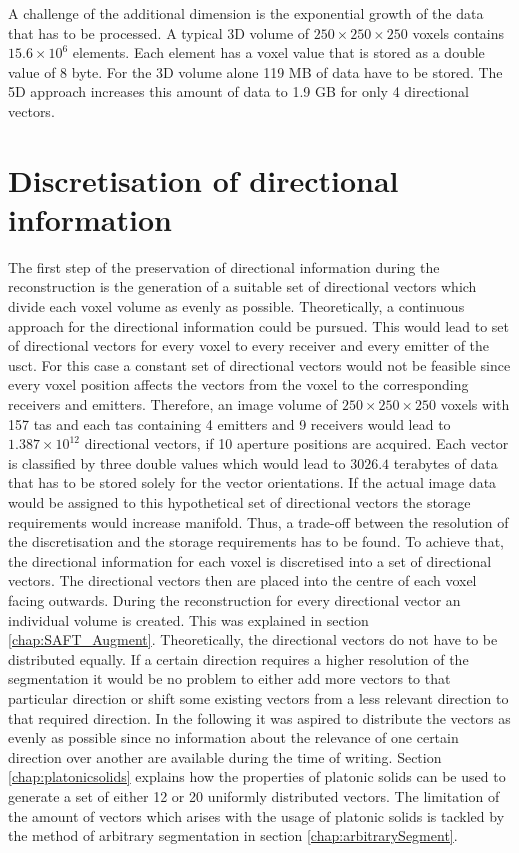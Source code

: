 A challenge of the additional dimension is the exponential growth of the data that has to be processed. A typical 3D volume of $250\times250\times250$ voxels contains $15.6\times10^6$ elements. Each element has a voxel value that is stored as a double value of 8 byte. For the 3D volume alone 119 MB of data have to be stored. The 5D approach increases this amount of data to 1.9 GB for only 4 directional vectors.   



\section{Discretisation of directional information}
\label{chap:segmentation}


The first step of the preservation of directional information during the reconstruction is the generation of a suitable set of directional vectors which divide each voxel volume as evenly as possible.
Theoretically, a continuous approach for the directional information could be pursued. This would lead to set of directional vectors for every voxel to every receiver and every emitter of the \ac{usct}. For this case a constant set of directional vectors would not be feasible since every voxel position affects the vectors from the voxel to the corresponding receivers and emitters. Therefore, an image volume of $250 \times 250 \times 250$ voxels with 157 \ac{tas} and each \ac{tas} containing 4 emitters and 9 receivers would lead to $1.387\times 10^{12}$ directional vectors, if 10 aperture positions are acquired. Each vector is classified by three double values which would lead to $3026.4$ terabytes of data that has to be stored solely for the vector orientations. If the actual image data would be assigned to this hypothetical set of directional vectors the storage requirements would increase manifold. Thus, a trade-off between the resolution of the discretisation and the storage requirements has to be found. To achieve that, the directional information for each voxel is discretised into a set of directional vectors. The directional vectors then are placed into the centre of each voxel facing outwards. During the reconstruction for every directional vector an individual volume is created. This was explained in section \ref{chap:SAFT_Augment}. Theoretically, the directional vectors do not have to be distributed equally. If a certain direction requires a higher resolution of the segmentation it would be no problem to either add more vectors to that particular direction or shift some existing vectors from a less relevant direction to that required direction. In the following it was aspired to distribute the vectors as evenly as possible since no information about the relevance of one certain direction over another are available during the time of writing.
Section \ref{chap:platonicsolids} explains how the properties of platonic solids can be used to generate a set of either 12 or 20 uniformly distributed vectors. The limitation of the amount of vectors which arises with the usage of platonic solids is tackled by the method of arbitrary segmentation in section \ref{chap:arbitrarySegment}.



